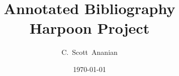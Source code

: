 \documentclass[10pt,notitlepage]{article}
\author{C.~Scott~Ananian}
\title{Annotated Bibliography \\ \Large Harpoon Project}
\date{\today}
\begin{document}

\maketitle
\nocite{*}
\end{document}
